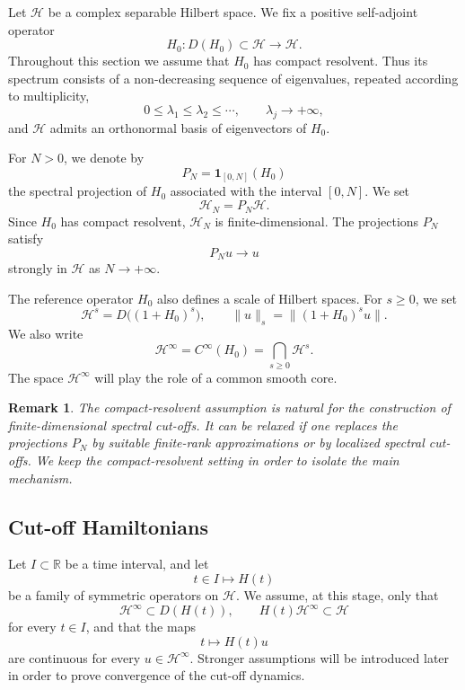 \documentclass[10pt,a4paper]{amsart}
\newtheorem{remark}[theorem]{Remark}
\newcommand{\Hilb}{\mathcal H}
\begin{document}
Let \(\Hilb\) be a complex separable Hilbert space.  We fix a positive
self-adjoint operator
\[
        H_0:D(H_0)\subset \Hilb\longrightarrow \Hilb.
\]
Throughout this section we assume that \(H_0\) has compact resolvent.
Thus its spectrum consists of a non-decreasing sequence of eigenvalues,
repeated according to multiplicity,
\[
        0\leq \lambda_1\leq \lambda_2\leq \cdots,
        \qquad
        \lambda_j\to+\infty,
\]
and \(\Hilb\) admits an orthonormal basis of eigenvectors of \(H_0\).

For \(N>0\), we denote by
\[
        P_N=\mathbf 1_{[0,N]}(H_0)
\]
the spectral projection of \(H_0\) associated with the interval
\([0,N]\).  We set
\[
        \Hilb_N=P_N\Hilb.
\]
Since \(H_0\) has compact resolvent, \(\Hilb_N\) is finite-dimensional.
The projections \(P_N\) satisfy
\[
        P_Nu\longrightarrow u
\]
strongly in \(\Hilb\) as \(N\to+\infty\).

The reference operator \(H_0\) also defines a scale of Hilbert spaces.
For \(s\geq0\), we set
\[
        \Hilb^s=D\big((1+H_0)^s\big),
        \qquad
        \|u\|_s=\|(1+H_0)^s u\|.
\]
We also write
\[
        \Hilb^\infty
        =
        C^\infty(H_0)
        =
        \bigcap_{s\geq0}\Hilb^s.
\]
The space \(\Hilb^\infty\) will play the role of a common smooth core.

\begin{remark}
The compact-resolvent assumption is natural for the construction of
finite-dimensional spectral cut-offs.  It can be relaxed if one replaces
the projections \(P_N\) by suitable finite-rank approximations or by
localized spectral cut-offs.  We keep the compact-resolvent setting in
order to isolate the main mechanism.
\end{remark}

\subsection{Cut-off Hamiltonians}

Let \(I\subset\mathbb R\) be a time interval, and let
\[
        t\in I\longmapsto H(t)
\]
be a family of symmetric operators on \(\Hilb\).  We assume, at this
stage, only that
\[
        \Hilb^\infty\subset D(H(t)),
        \qquad
        H(t)\Hilb^\infty\subset \Hilb
\]
for every \(t\in I\), and that the maps
\[
        t\longmapsto H(t)u
\]
are continuous for every \(u\in \Hilb^\infty\).  Stronger assumptions
will be introduced later in order to prove convergence of the cut-off
dynamics.
\end{document}
